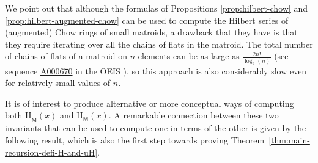 \documentclass[11pt, a4paper, english]{amsart}
\theoremstyle{teoremas}
\newtheorem{lemma}[theorem]{Lemma}
\theoremstyle{definition}
\newcommand{\M}{\mathsf{M}}
\newcommand{\Z}{\mathbb{Z}}
\renewcommand{\H}{\mathrm{H}}
\newcommand{\uH}{\underline{\mathrm{H}}}
\begin{document}
\begin{comment}
    
    A proof of this result can be produced by adapting several steps in the original proof of Proposition~\ref{prop:hilbert-chow}. We require the following preliminary result. 
    
    \begin{lemma}[Corollary 1 in \cite{feichtner-yuzvinsky}]
        Let $\mathcal{L}$ be an atomic lattice and let
        $\mathcal{G}$ be a building set in $\mathcal{L}$. A monomial $\Z$-basis of the Chow ring
        $D(\mathcal{L}, \mathcal{G})$ of $\mathcal{G}$
        is given by
        \begin{equation*}
            \left\{\prod_{A \in \mathcal S} x_A^{m_A} \mathrel{\Big|} \mathcal S \in \mathcal N(\mathcal{L}, \mathcal{G}), m_A < d\left(\bigvee \mathcal S \cap \mathcal{L}_{< A}, A\right)\right\}.
        \end{equation*}
    \end{lemma}
    
    
    
    \begin{proof}[Proof of \Cref{prop:hilbert-augmented-chow}]
        \todo[inline]{LF: Perhaps Matthew can put his proof here. I get confused with the details, but the statement should be completely correct as stated. Notice that we do not require to ``add a coloop'' to our matroid}
        \todo[inline]{working on this in the "goal 3 scratch work" document. - Matthew}
        \todo[inline]{update: it's basically done, but I should make some notational and organizational improvements before merging it into the main document.}
        Combine \Cref{augFYpresentation} and \cite[Corollary 1]{feichtner-yuzvinsky}.
    \end{proof}
\end{comment}

We point out that although the formulas of Propositions \ref{prop:hilbert-chow} and \ref{prop:hilbert-augmented-chow} can be used to compute the Hilbert series of (augmented) Chow rings of small matroids, a drawback that they have is that they require iterating over all the chains of flats in the matroid. The total number of chains of flats of a matroid on $n$ elements can be as large as $\frac{2n!}{\log_2(n)}$ (see sequence \hyperlink{https://oeis.org/A000670}{A000670} in the OEIS \cite{oeis}), so this approach is also considerably slow even for relatively small values of $n$. 

It is of interest to produce alternative or more conceptual ways of computing both  $\uH_{\M}(x)$ and $\H_{\M}(x)$. A remarkable connection between these two invariants that can be used to compute one in terms of the other is given by the following result, which is also the first step towards proving Theorem~\ref{thm:main-recursion-defi-H-and-uH}.
\end{document}
